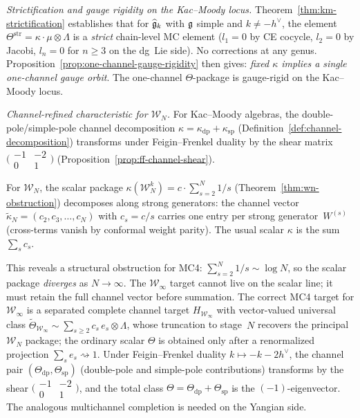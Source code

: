 \emph{Strictification and gauge rigidity on the Kac--Moody locus.}
Theorem~\ref{thm:km-strictification} establishes that for
$\widehat{\mathfrak{g}}_k$ with $\mathfrak{g}$ simple and $k \neq -h^\vee$,
the element $\Theta^{\mathrm{str}} = \kappa \cdot \mu \otimes
\Lambda$ is a \emph{strict} chain-level MC element
($l_1 = 0$ by CE cocycle, $l_2 = 0$ by Jacobi, $l_n = 0$ for
$n \geq 3$ on the dg~Lie side).  No corrections at any genus.
Proposition~\ref{prop:one-channel-gauge-rigidity} then gives:
\emph{fixed $\kappa$ implies a single one-channel gauge orbit}.
The one-channel $\Theta$-package is gauge-rigid on the
Kac--Moody locus.

\emph{Channel-refined characteristic for $\mathcal{W}_N$.}
For Kac--Moody algebras, the double-pole/simple-pole channel
decomposition $\kappa = \kappa_{\mathrm{dp}} + \kappa_{\mathrm{sp}}$
(Definition~\ref{def:channel-decomposition}) transforms under
Feigin--Frenkel duality by the shear matrix
$\bigl(\begin{smallmatrix} -1 & -2 \\ 0 & 1
\end{smallmatrix}\bigr)$
(Proposition~\ref{prop:ff-channel-shear}).

For $\mathcal{W}_N$, the scalar package
$\kappa(\mathcal{W}_N^k) = c \cdot \sum_{s=2}^N 1/s$
(Theorem~\ref{thm:wn-obstruction})
decomposes along strong generators:
the channel vector
$\tilde{\kappa}_N = (c_2, c_3, \ldots, c_N)$ with $c_s = c/s$
carries one entry per strong generator~$W^{(s)}$ (cross-terms
vanish by conformal weight parity).
The usual scalar $\kappa$ is the sum $\sum_s c_s$.

This reveals a structural obstruction for MC4:
$\sum_{s=2}^N 1/s \sim \log N$, so the scalar package
\emph{diverges} as $N \to \infty$.  The $\mathcal{W}_\infty$ target
cannot live on the scalar line; it must retain the full channel
vector before summation.  The correct MC4 target for
$\mathcal{W}_\infty$ is a separated complete channel target
$H_{\mathcal{W}_\infty}$ with vector-valued universal class
$\tilde{\Theta}_{\mathcal{W}_\infty} \sim
\sum_{s \geq 2} c_s\, e_s \otimes \Lambda$,
whose truncation to stage~$N$ recovers the principal
$\mathcal{W}_N$ package; the ordinary scalar $\Theta$ is obtained
only after a renormalized projection $\sum_s e_s \rightsquigarrow 1$.
Under Feigin--Frenkel duality $k \mapsto -k - 2h^\vee$, the
channel pair $(\Theta_{\mathrm{dp}}, \Theta_{\mathrm{sp}})$
(double-pole and simple-pole contributions) transforms by the
shear $\bigl(\begin{smallmatrix} -1 & -2 \\ 0 & 1
\end{smallmatrix}\bigr)$, and the total class
$\Theta = \Theta_{\mathrm{dp}} + \Theta_{\mathrm{sp}}$ is
the $(-1)$-eigenvector.
The analogous multichannel completion is needed on the Yangian side.

